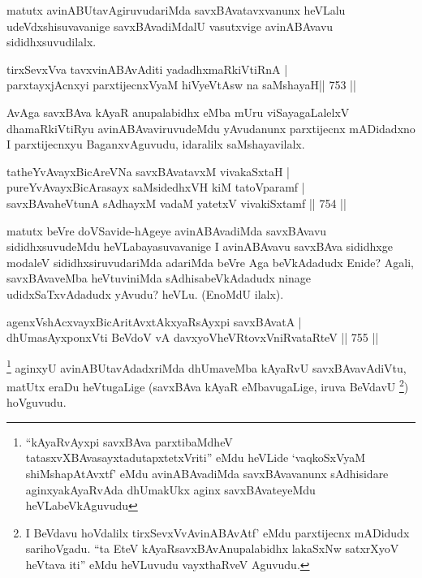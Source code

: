 \begin{artha}
matutx avinABUtavAgiruvudariMda savxBAvatavxvanunx heVLalu udeVdxshisuvavanige savxBAvadiMdalU vasutxvige avinABAvavu sididhxsuvudilalx.
\end{artha}


\begin{shl}
tirxSevxVva tavxvinABAvAditi yadadhxmaRkiVtiRnA | \\
parxtayxjAcnxyi parxtijecnxVyaM hiVyeVtAsw na saMshayaH\hfill ||  753 ||  
\end{shl}

\begin{artha}
AvAga savxBAva kAyaR anupalabidhx eMba mUru viSayagaLalelxV dhamaRkiVtiRyu avinABAvaviruvudeMdu yAvudanunx parxtijecnx mADidadxno I parxtijecnxyu BaganxvAguvudu, idaralilx saMshayavilalx.
\end{artha}

\begin{shl}
tatheYvAvayxBicAreVNa savxBAvatavxM vivakaSxtaH | \\
pureYvAvayxBicArasayx saMsidedhxVH kiM tatoV\s paramf | \\
savxBAvaheVtunA sAdhayxM vadaM yatetxV vivakiSxtamf \hfill||  754 ||  
\end{shl}

\begin{artha}
matutx beVre doVSavide-hAgeye avinABAvadiMda savxBAvavu sididhxsuvudeMdu heVLabayasuvavanige I avinABAvavu savxBAva sididhxge modaleV sididhxsiruvudariMda adariMda beVre Aga beVkAdadudx Enide? Agali, savxBAvaveMba heVtuviniMda sAdhisabeVkAdadudx ninage udidxSaTxvAdadudx yAvudu? heVLu. (EnoMdU ilalx).
\end{artha}


\begin{shl}
agenxVshAcxvayxBicAritAvxtAkxyaRsAyxpi savxBAvatA | \\
dhUmasAyx\s \s ponxVti BeVdoV vA davxyoVheVRtovxVniRvataRteV \hfill||  755 ||  
\end{shl}

\begin{artha}
\footnote{``kAyaRvAyxpi savxBAva parxtibaMdheV tatasxvXBAvasayxtadutapxtetxVriti'' eMdu heVLide `vaqkoSxV\s yaM shiMshapAtAvxtf' eMdu avinABAvadiMda savxBAvavanunx sAdhisidare aginxyakAyaRvAda dhUmakUkx aginx savxBAvateyeMdu heVLabeVkAguvudu}
aginxyU avinABUtavAdadxriMda dhUmaveMba kAyaRvU savxBAvavAdiVtu, matUtx eraDu heVtugaLige (savxBAva kAyaR eMbavugaLige, iruva BeVdavU \footnote{I BeVdavu hoVdalilx tirxSevxVvAvinABAvAtf' eMdu parxtijecnx mADidudx sarihoVgadu. ``ta EteV kAyaRsavxBAvAnupalabidhx lakaSxNw satxrXyoV heVtava iti'' eMdu heVLuvudu vayxthaRveV Aguvudu.}) hoVguvudu.
\end{artha}

